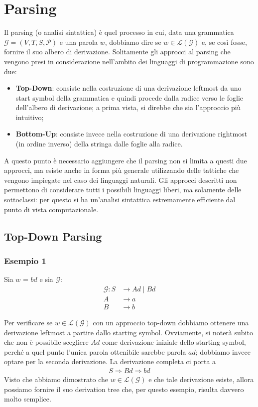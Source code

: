 \documentclass[class=book, crop=false, oneside, 12pt]{standalone}
\begin{document}
\section{Parsing}
Il parsing (o analisi sintattica) è quel processo in cui, data una grammatica \(\mathcal{G} = (V, T, S, \mathcal{P})\) e una parola \(w\), dobbiamo dire se \(w \in \mathcal{L(G)}\) e, se così fosse, fornire il suo albero di derivazione. Solitamente gli approcci al parsing che vengono presi in considerazione nell'ambito dei linguaggi di programmazione sono due: 
\begin{itemize}
    \item \textbf{Top-Down}: consiste nella costruzione di una derivazione leftmost da uno start symbol della grammatica e quindi procede dalla radice verso le foglie dell'albero di derivazione; a prima vista, si direbbe che sia l'approccio più intuitivo;
    \item \textbf{Bottom-Up}: consiste invece nella costruzione di una derivazione rightmost (in ordine inverso) della stringa dalle foglie alla radice.
\end{itemize}
A questo punto è necessario aggiungere che il parsing non si limita a questi due approcci, ma esiste anche in forma più generale utilizzando delle tattiche che vengono impiegate nel caso dei linguaggi naturali. Gli approcci descritti non permettono di considerare tutti i possibili linguaggi liberi, ma solamente delle sottoclassi: per questo si ha un'analisi sintattica estremamente efficiente dal punto di vista computazionale.

\subsection{Top-Down Parsing}
\subsubsection{Esempio 1}
Sia \(w\) = \(bd\) e sia \(\mathcal{G}\): 
\begin{align*}
    \mathcal{G}: S &\rightarrow Ad \mid Bd \\
    A &\rightarrow a \\
    B &\rightarrow b
\end{align*}

Per verificare se \(w \in \mathcal{L(G)}\) con un approccio top-down dobbiamo ottenere una derivazione leftmost a partire dallo starting symbol. Ovviamente, si noterà subito che non è possibile scegliere \(Ad\) come derivazione iniziale dello starting symbol, perché a quel punto l'unica parola ottenibile sarebbe parola \(ad\); dobbiamo invece optare per la seconda derivazione. La derivazione completa ci porta a
\begin{align*}
    S \Rightarrow Bd \Rightarrow bd
\end{align*}
Visto che abbiamo dimostrato che \(w \in \mathcal{L(G)}\) e che tale derivazione esiste, allora possiamo fornire il suo derivation tree che, per questo esempio, risulta davvero molto semplice.
\end{document}
